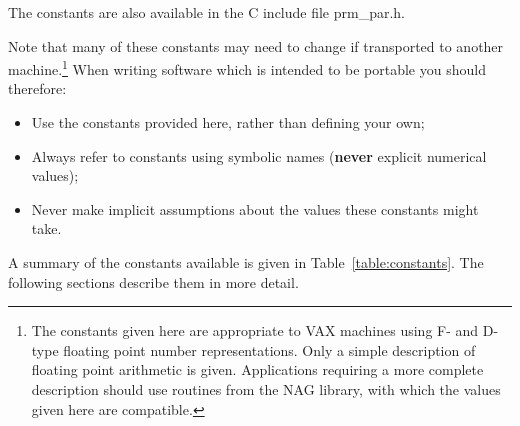 \documentclass[11pt,nolof]{starlink}
\providecommand{\name}[1]{#1}
\begin{document}
The constants are also available in the C include file \name{prm\_par.h}.

Note that many of these constants may need to change if transported to
another machine.\footnote{
The constants given here are appropriate to \name{VAX} machines using F- and
D-type floating point number representations.
Only a simple description of floating point arithmetic is given.
Applications requiring a more complete description should use routines
from the \name{NAG} library, with which the values given here are compatible.}
When writing software which is intended to be portable you should therefore:

\begin{itemize}

\item Use the constants provided here, rather than defining your own;

\item Always refer to constants using symbolic names (\textbf{never} explicit
numerical values);

\item Never make implicit assumptions about the values these constants might
take.

\end{itemize}

A summary of the constants available is given in
Table~\ref{table:constants}.
The following sections describe them in more detail.
\end{document}
